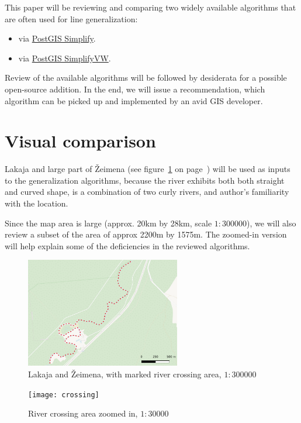 \documentclass[a4paper]{article}
\begin{document}
This paper will be reviewing and comparing two widely available algorithms that
are often used for line generalization:
\begin{itemize}
    \item \cite{douglas1973algorithms} via
        \href{https://postgis.net/docs/ST_Simplify.html}{PostGIS Simplify}.

    \item \cite{visvalingam1993line} via
        \href{https://postgis.net/docs/ST_SimplifyVW.html}{PostGIS SimplifyVW}.
\end{itemize}

Review of the available algorithms will be followed by desiderata for a
possible open-source addition. In the end, we will issue a recommendation,
which algorithm can be picked up and implemented by an avid GIS developer.

\section{Visual comparison}

Lakaja and large part of Žeimena (see figure~\ref{fig:zeimena} on
page~\pageref{fig:zeimena}) will be used as inputs to the generalization
algorithms, because the river exhibits both both straight and curved shape, is
a combination of two curly rivers, and author's familiarity with the location.

Since the map area is large (approx. 20km by 28km, scale $1:300 000$), we will
also review a subset of the area of approx 2200m by 1575m. The zoomed-in
version will help explain some of the deficiencies in the reviewed algorithms.

\begin{figure}[h]
    \centering
    \includegraphics[width=67.5mm]{zeimena}
    \caption{Lakaja and Žeimena, with marked river crossing area, $1:300 000$}
    \label{fig:zeimena}
\end{figure}

\begin{figure}[h]
    \centering
    \texttt{[image: crossing]}
    \caption{River crossing area zoomed in, $1:30 000$}
    \label{fig:crossing}
\end{figure}
\end{document}
